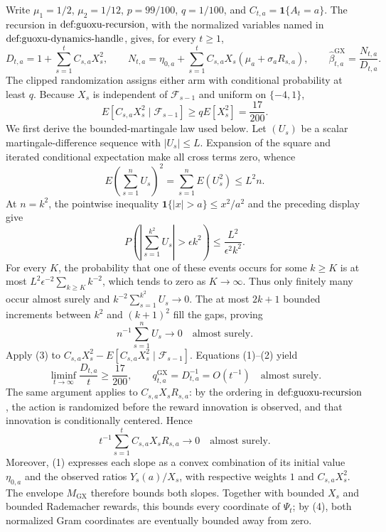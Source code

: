 Write \(\mu_1=1/2\), \(\mu_2=1/12\), \(p=99/100\), \(q=1/100\), and \(C_{t,a}=\mathbf 1\{A_t=a\}\). The recursion in \(\textnormal{def:guoxu-recursion}\), with the normalized variables named in \(\textnormal{def:guoxu-dynamics-handle}\), gives, for every \(t\geq1\),
\[
 D_{t,a}=1+\sum_{s=1}^t C_{s,a}X_s^2,\qquad
 N_{t,a}=\eta_{0,a}+\sum_{s=1}^t C_{s,a}X_s(\mu_a+\sigma_aR_{s,a}),\qquad
 \widehat\beta^{\mathrm{GX}}_{t,a}=\frac{N_{t,a}}{D_{t,a}}. \tag{1}
\]
The clipped randomization assigns either arm with conditional probability at least \(q\). Because \(X_s\) is independent of \(\mathcal F_{s-1}\) and uniform on \(\{-4,1\}\),
\[
 E[C_{s,a}X_s^2\mid\mathcal F_{s-1}]
 \geq qE[X_s^2]=\frac{17}{200}. \tag{2}
\]
We first derive the bounded-martingale law used below. Let \((U_s)\) be a scalar martingale-difference sequence with \(|U_s|\leq L\). Expansion of the square and iterated conditional expectation make all cross terms zero, whence
\[
 E\left(\sum_{s=1}^nU_s\right)^2=\sum_{s=1}^nE(U_s^2)\leq L^2n.
\]
At \(n=k^2\), the pointwise inequality \(\mathbf 1\{|x|>a\}\leq x^2/a^2\) and the preceding display give
\[
 P\left(\left|\sum_{s=1}^{k^2}U_s\right|>\epsilon k^2\right)
 \leq \frac{L^2}{\epsilon^2k^2}.
\]
For every \(K\), the probability that one of these events occurs for some \(k\geq K\) is at most \(L^2\epsilon^{-2}\sum_{k\geq K}k^{-2}\), which tends to zero as \(K\to\infty\). Thus only finitely many occur almost surely and \(k^{-2}\sum_{s=1}^{k^2}U_s\to0\). The at most \(2k+1\) bounded increments between \(k^2\) and \((k+1)^2\) fill the gaps, proving
\[
 n^{-1}\sum_{s=1}^nU_s\longrightarrow0\quad\text{almost surely}. \tag{3}
\]
Apply (3) to \(C_{s,a}X_s^2-E[C_{s,a}X_s^2\mid\mathcal F_{s-1}]\). Equations (1)--(2) yield
\[
 \liminf_{t\to\infty}\frac{D_{t,a}}t\geq\frac{17}{200},
 \qquad q^{\mathrm{GX}}_{t,a}=D_{t,a}^{-1}=O(t^{-1})
 \quad\text{almost surely}. \tag{4}
\]
The same argument applies to \(C_{s,a}X_sR_{s,a}\): by the ordering in \(\textnormal{def:guoxu-recursion}\), the action is randomized before the reward innovation is observed, and that innovation is conditionally centered. Hence
\[
 t^{-1}\sum_{s=1}^tC_{s,a}X_sR_{s,a}\longrightarrow0
 \quad\text{almost surely}. \tag{5}
\]
Moreover, (1) expresses each slope as a convex combination of its initial value \(\eta_{0,a}\) and the observed ratios \(Y_s(a)/X_s\), with respective weights \(1\) and \(C_{s,a}X_s^2\). The envelope \(M_{\mathrm{GX}}\) therefore bounds both slopes. Together with bounded \(X_s\) and bounded Rademacher rewards, this bounds every coordinate of \(\Psi_t\); by (4), both normalized Gram coordinates are eventually bounded away from zero.

